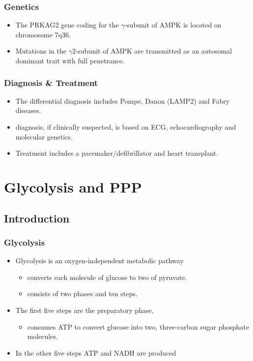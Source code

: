 \documentclass{scrartcl}
\begin{document}
\subsubsection{Genetics}
\label{sec:org7cdcc22}
\begin{itemize}
\item The PRKAG2 gene coding for the \(\gamma\)-subunit of AMPK is located on chromosome 7q36.
\item Mutations in the \(\gamma\)2-subunit of AMPK are transmitted as an
autosomal dominant trait with full penetrance.
\end{itemize}

\subsubsection{Diagnosis \& Treatment}
\label{sec:orgd2bd4e8}
\begin{itemize}
\item The differential diagnosis includes Pompe, Danon (LAMP2) and Fabry diseases.

\item diagnosis, if clinically suspected, is based on ECG,
echocardiography and molecular genetics.

\item Treatment includes a pacemaker/defibrillator and heart transplant.
\end{itemize}

\section{Glycolysis and PPP}
\label{sec:orgd14385a}
\subsection{Introduction}
\label{sec:org2cfa820}
\subsubsection{Glycolysis}
\label{sec:orgfae91dc}
\begin{itemize}
\item Glycolysis is an oxygen-independent metabolic pathway
\begin{itemize}
\item converts each molecule of glucose to two of pyruvate.
\item consists of two phases and ten steps.
\end{itemize}
\item The first five steps are the preparatory phase,
\begin{itemize}
\item consumes ATP to convert glucose into two, three-carbon sugar
phosphate molecules.
\end{itemize}
\item In the other five steps ATP and NADH are produced
\end{itemize}
\end{document}
